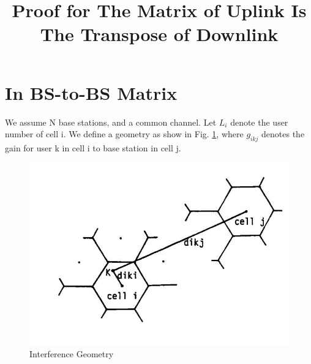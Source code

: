 \documentclass[12pt]{article}
\begin{document}
%	
 

\title{ Proof for The Matrix of Uplink Is The Transpose of Downlink} 
\date{}
\maketitle	
%	

\section{In BS-to-BS Matrix}
We assume N base stations, and a common channel. Let $L_i$ denote the user number of cell i. We define a geometry as show in Fig. \ref{fig:t }, where $g_{ikj}$ denotes the gain for user k in cell i to base station in cell j.%
%


\begin{figure}[th]
	\centering
	\includegraphics[width=0.7\linewidth]{t}
	\caption{Interference Geometry}
	\label{fig:t }
\end{figure}
\end{document}
